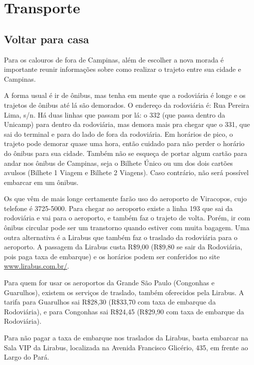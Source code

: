 
\section{Transporte}
\subsection{Voltar para casa}

Para os calouros de fora de Campinas, além de escolher a nova morada é
importante reunir informações sobre como realizar o trajeto entre sua cidade e
Campinas.

A forma usual é ir de ônibus, mas tenha em mente que a rodoviária é longe e os
trajetos de ônibus até lá são demorados. O endereço da rodoviária é: Rua Pereira
Lima, s/n. Há duas linhas que passam por lá: o 332 (que passa dentro da Unicamp)
para dentro da rodoviária, mas demora mais pra chegar que o 331, que sai do
terminal e para do lado de fora da rodoviária. Em horários de pico, o trajeto
pode demorar quase uma hora, então cuidado para não perder o horário do ônibus
para sua cidade. Também não se esqueça de portar algum cartão para andar nos
ônibus de Campinas, seja o Bilhete Único ou um dos dois cartões avulsos (Bilhete
1 Viagem e Bilhete 2 Viagens). Caso contrário, não será possível embarcar em um
ônibus.

Os que vêm de mais longe certamente farão uso do aeroporto de Viracopos, cujo
telefone é 3725-5000. Para chegar ao aeroporto existe a linha 193 que sai da
rodoviária e vai para o aeroporto, e também faz o trajeto de volta. Porém, ir
com ônibus circular pode ser um transtorno quando estiver com muita bagagem. Uma
outra alternativa é a Lirabus que também faz o traslado da rodoviária para o
aeroporto. A passagem da Lirabus custa R\$9,00 (R\$9,80 se sair da Rodoviária,
pois paga taxa de embarque) e os horários podem ser conferidos no site
\url{www.lirabus.com.br/}.

Para quem for usar os aeroportos da Grande São Paulo (Congonhas e Guarulhos),
existem os serviços de traslado, também oferecidos pela Lirabus. A tarifa para
Guarulhos sai R\$28,30 (R\$33,70 com taxa de embarque da Rodoviária), e para
Congonhas sai R\$24,45 (R\$29,90 com taxa de embarque da Rodoviária).

Para não pagar a taxa de embarque nos traslados da Lirabus, basta embarcar na
Sala VIP da Lirabus, localizada na Avenida Francisco Glicério, 435, em frente ao
Largo do Pará.

